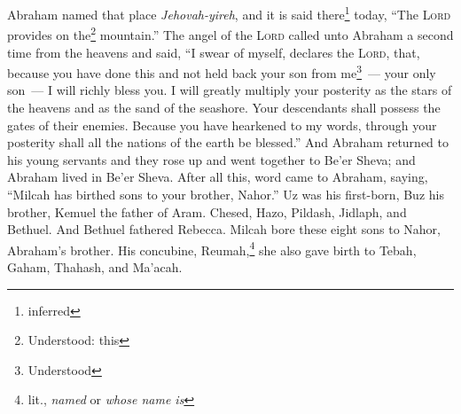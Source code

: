 \begin{enumerate*}[mode=unboxed]
     Abraham named that place \textit{Jehovah-yireh}, and it is said there\footnote{inferred} today, ``The \textsc{Lord} provides on the\footnote{Understood: this} mountain.''%
     The angel of the \textsc{Lord} called unto Abraham a second time from the heavens%
     and said, ``I swear of myself, declares the \textsc{Lord}, that, because you have done this and not held back your son from me\footnote{Understood}~--- your only son~---%
     I will richly bless you. I will greatly multiply your posterity as the stars of the heavens and as the sand of the seashore. Your descendants shall possess the gates of their enemies.%
     Because you have hearkened to my words, through your posterity shall all the nations of the earth be blessed.''%
     And Abraham returned to his young servants and they rose up and went together to Be'er Sheva; and Abraham lived in Be'er Sheva.%
     After all this, word came to Abraham, saying, ``Milcah has birthed sons to your brother, Nahor.''%
     Uz was his first-born, Buz his brother, Kemuel the father of Aram.%
     Chesed, Hazo, Pildash, Jidlaph, and Bethuel.%
     And Bethuel fathered Rebecca. Milcah bore these eight sons to Nahor, Abraham's brother.%
     His concubine, Reumah,\footnote{lit., \textit{named} or \textit{whose name is}} she also gave birth to Tebah, Gaham, Thahash, and Ma'acah.%
\end{enumerate*}
